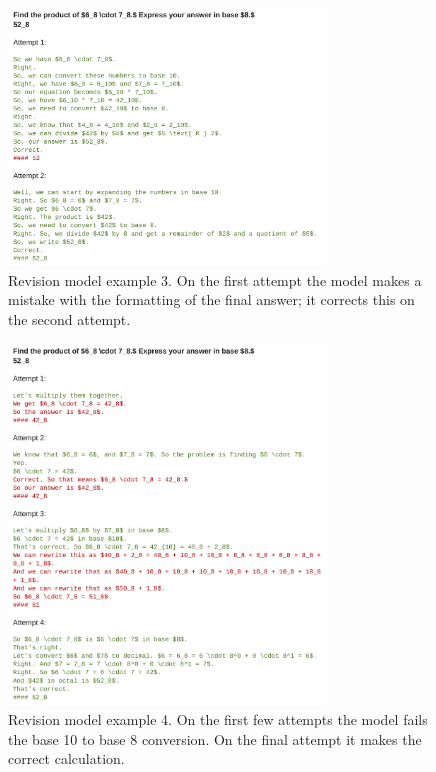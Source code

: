 \documentclass[11pt, letterpaper, logo]{googledeepmind}
\begin{document}
\begin{figure}
    \centering
    \includegraphics[width=0.75\textwidth]{revisions_ex3.png}
    \caption{Revision model example 3. On the first attempt the model makes a mistake with the formatting of the final answer; it corrects this on the second attempt.}
    \label{fig:revisions_ex3}
\end{figure}

\begin{figure}
    \centering
    \includegraphics[width=0.75\textwidth]{revisions_ex4.png}
    \caption{Revision model example 4. On the first few attempts the model fails the base 10 to base 8 conversion. On the final attempt it makes the correct calculation.}
    \label{fig:revisions_ex4}
\end{figure}
\end{document}
